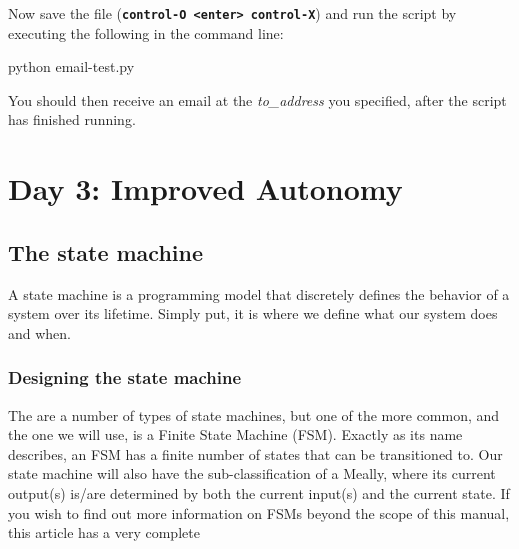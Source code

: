 \documentclass{article}
\newcommand*{\myfont}{\fontfamily{pcr}\selectfont}
\newcommand{\codeb}[2]{
  \begin{tcolorbox}[width=\textwidth,colback={SpringGreen},title={#1},colbacktitle=darkgreen,coltitle=SpringGreen]
    \myfont
    #2
  \end{tcolorbox}
} %
\begin{document}
    \newline
    \noindent
    Now save the file (\textbf{\texttt{control-O <enter> control-X}}) and run the script by executing the following in the command line:
    \codeb{Run the test script for email}{
      python email-test.py
    }
    You should then receive an email at the \textit{to\_address} you specified, after the script has finished running.
    
\section{Day 3: Improved Autonomy}
\subsection{The state machine}
A state machine is a programming model that discretely defines the behavior of a system over its lifetime. Simply put, it is where we define what our system does and when.
  \subsubsection{Designing the state machine}
  The are a number of types of state machines, but one of the more common, and the one we will use, is a Finite State Machine (FSM). Exactly as its name describes, an FSM has a finite number of states that can be transitioned to. Our state machine will also have the sub-classification of a Meally, where its current output(s) is/are determined by both the current input(s) and the current state. If you wish to find out more information on FSMs beyond the scope of this manual, this article has a very complete
\end{document}
